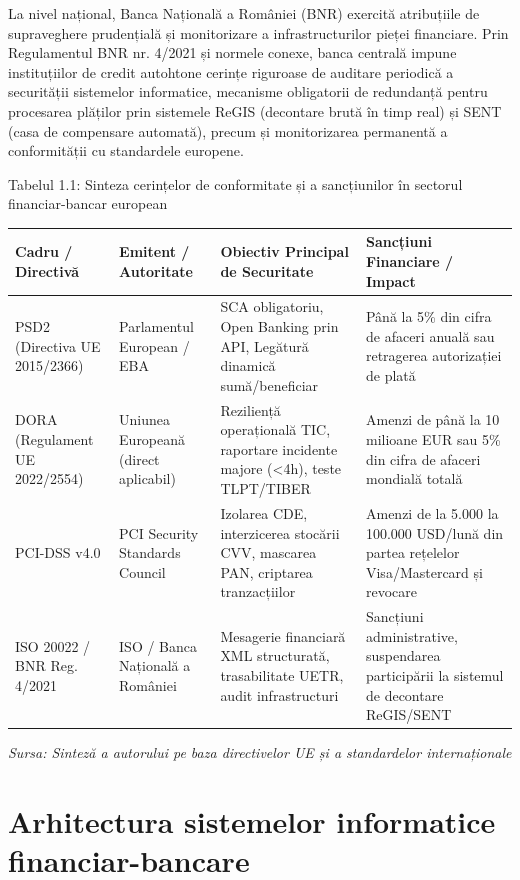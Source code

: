 La nivel național, Banca Națională a României (BNR) exercită atribuțiile de supraveghere prudențială și monitorizare a infrastructurilor pieței financiare. Prin Regulamentul BNR nr. 4/2021 și normele conexe, banca centrală impune instituțiilor de credit autohtone cerințe riguroase de auditare periodică a securității sistemelor informatice, mecanisme obligatorii de redundanță pentru procesarea plăților prin sistemele ReGIS (decontare brută în timp real) și SENT (casa de compensare automată), precum și monitorizarea permanentă a conformității cu standardele europene.

Tabelul 1.1: Sinteza cerințelor de conformitate și a sancțiunilor în sectorul financiar-bancar european

\begin{table}[htbp]
\centering
\small
\begin{tabular}{p{} p{} p{} p{}}
\toprule
Cadru / Directivă & Emitent / Autoritate & Obiectiv Principal de Securitate & Sancțiuni Financiare / Impact \\
\midrule
PSD2 (Directiva UE 2015/2366) & Parlamentul European / EBA & SCA obligatoriu, Open Banking prin API, Legătură dinamică sumă/beneficiar & Până la 5\% din cifra de afaceri anuală sau retragerea autorizației de plată \\
DORA (Regulament UE 2022/2554) & Uniunea Europeană (direct aplicabil) & Reziliență operațională TIC, raportare incidente majore (<4h), teste TLPT/TIBER & Amenzi de până la 10 milioane EUR sau 5\% din cifra de afaceri mondială totală \\
PCI-DSS v4.0 & PCI Security Standards Council & Izolarea CDE, interzicerea stocării CVV, mascarea PAN, criptarea tranzacțiilor & Amenzi de la 5.000 la 100.000 USD/lună din partea rețelelor Visa/Mastercard și revocare \\
ISO 20022 / BNR Reg. 4/2021 & ISO / Banca Națională a României & Mesagerie financiară XML structurată, trasabilitate UETR, audit infrastructuri & Sancțiuni administrative, suspendarea participării la sistemul de decontare ReGIS/SENT \\
\bottomrule
\end{tabular}
\end{table}

\textit{Sursa: Sinteză a autorului pe baza directivelor UE și a standardelor internaționale}

\section{Arhitectura sistemelor informatice financiar-bancare}

